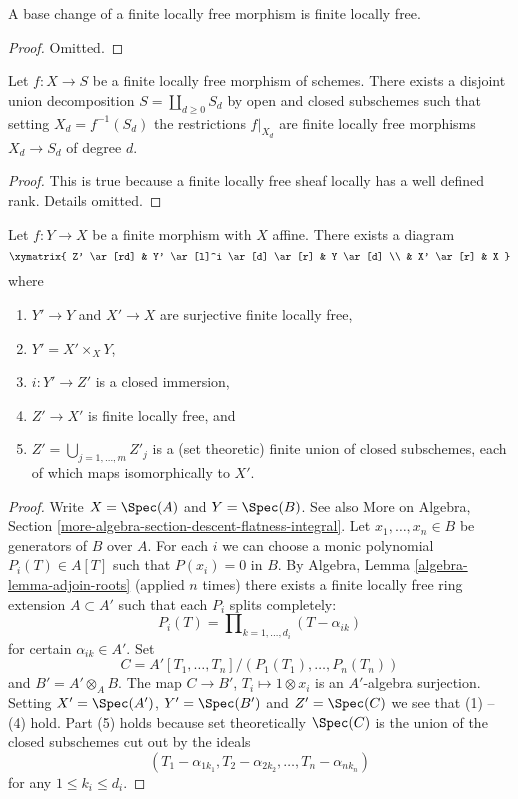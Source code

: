 \begin{lemma}
\label{lemma-base-change-finite-locally-free}
A base change of a finite locally free morphism is finite locally free.
\end{lemma}

\begin{proof}
Omitted.
\end{proof}

\begin{lemma}
\label{lemma-finite-locally-free}
Let $f : X \to S$ be a finite locally free morphism of schemes.
There exists a disjoint union decomposition
$S = \coprod_{d \geq 0} S_d$ by open and closed subschemes
such that setting $X_d = f^{-1}(S_d)$ the restrictions
$f|_{X_d}$ are finite locally free morphisms $X_d \to S_d$
of degree $d$.
\end{lemma}

\begin{proof}
This is true because a finite locally free sheaf locally has
a well defined rank. Details omitted.
\end{proof}

\begin{lemma}
\label{lemma-massage-finite}
Let $f : Y \to X$ be a finite morphism with $X$ affine.
There exists a diagram
$$
\xymatrix{
Z' \ar[rd] &
Y' \ar[l]^i \ar[d] \ar[r] &
Y \ar[d] \\
 & X' \ar[r] & X
}
$$
where
\begin{enumerate}
\item $Y' \to Y$ and $X' \to X$ are surjective finite locally free,
\item $Y' = X' \times_X Y$,
\item $i : Y' \to Z'$ is a closed immersion,
\item $Z' \to X'$ is finite locally free, and
\item $Z' = \bigcup_{j = 1, \ldots, m} Z'_j$ is a (set theoretic)
finite union of closed subschemes, each of which maps isomorphically
to $X'$.
\end{enumerate}
\end{lemma}

\begin{proof}
Write $X = \Spec(A)$ and $Y = \Spec(B)$. See also
More on Algebra, Section \ref{more-algebra-section-descent-flatness-integral}.
Let $x_1, \ldots, x_n \in B$ be generators of $B$ over $A$.
For each $i$ we can choose a monic polynomial $P_i(T) \in A[T]$
such that $P(x_i) = 0$ in $B$. By
Algebra, Lemma \ref{algebra-lemma-adjoin-roots}
(applied $n$ times) there exists a finite locally free ring
extension $A \subset A'$ such that each $P_i$ splits completely:
$$
P_i(T) = \prod\nolimits_{k = 1, \ldots, d_i} (T - \alpha_{ik})
$$
for certain $\alpha_{ik} \in A'$. Set
$$
C = A'[T_1, \ldots, T_n]/(P_1(T_1), \ldots, P_n(T_n))
$$
and $B' = A' \otimes_A B$. The map $C \to B'$, $T_i \mapsto 1 \otimes x_i$
is an $A'$-algebra surjection. Setting $X' = \Spec(A')$,
$Y' = \Spec(B')$ and $Z' = \Spec(C)$ we see that
(1) -- (4) hold. Part (5) holds because set theoretically
$\Spec(C)$ is the union of the closed subschemes
cut out by the ideals
$$
(T_1 - \alpha_{1k_1}, T_2 - \alpha_{2k_2}, \ldots, T_n - \alpha_{nk_n})
$$
for any $1 \leq k_i \leq d_i$.
\end{proof}

